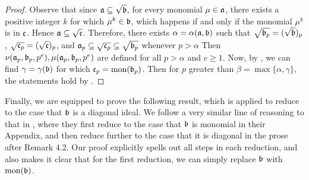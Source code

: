 \documentclass[11pt]{amsart}
\begin{document}
\begin{proof}
Observe that since $\mathfrak{a} \subseteq \sqrt{\mathfrak{b}}$, for every monomial $\mu \in \mathfrak{a}$, there exists a positive integer $k$ for which $\mu^k \in \mathfrak{b}$, which happens if and only if the monomial $\mu^k$ is in $\mathfrak{c}$.  Hence $\mathfrak{a} \subseteq \sqrt{\mathfrak{c}}$.
Therefore, there exists $\alpha = \alpha(\mathfrak{a}, \mathfrak{b})$ such that 
$\sqrt{\mathfrak{b}_p} = (\sqrt{\mathfrak{b}})_p$, $\sqrt{\mathfrak{c}_p} = (\sqrt{\mathfrak{c}})_p$, and 
 $\mathfrak{a}_p \subseteq \sqrt{\mathfrak{c}_p} \subseteq 
\sqrt{\mathfrak{b}_p}$ whenever $p > \alpha$
Then
$\nu(\mathfrak{a}_p, \mathfrak{b}_p, p^e), \mu(\mathfrak{a}_p, \mathfrak{b}_p, p^e)$ are defined for all $p > \alpha$ and $e \geq 1$. 
Now, by , we can find $\gamma = \gamma(\mathfrak{b})$ for which $\mathfrak{c}_p = \operatorname{mon}(\mathfrak{b}_p)$.  Then for $p$ greater than $\beta = \max\{ \alpha, \gamma \}$, the statements hold by .
\end{proof}


Finally, we are equipped to prove the following result, which is applied to reduce  to the case that $\mathfrak{b}$ is a diagonal ideal. We follow a very similar line of reasoning to that in \cite{budur+mustata+saito.roots_bs_polys_monomial}, where they first reduce to the case that $\mathfrak{b}$ is monomial in their Appendix, and then reduce further to the case that it is diagonal in the prose after Remark 4.2.  
Our proof explicitly spells out all steps in each reduction, 
and also makes it clear that for the first reduction, we can simply replace $\mathfrak{b}$ with $\operatorname{mon}(\mathfrak{b})$.
\end{document}
